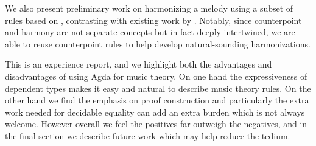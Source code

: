 We also present preliminary work on harmonizing a melody using
a subset of rules based on \citet{piston-harmony}, contrasting with
existing work by \citet{koops-fharm}. Notably, since counterpoint and
harmony are not separate concepts but in fact deeply intertwined, we
are able to reuse counterpoint rules to help develop natural-sounding
harmonizations.

This is an experience report, and we highlight both the advantages and
disadvantages of using Agda for music theory. On one hand the
expressiveness of dependent types makes it easy and natural to
describe music theory rules. On the other hand we find the emphasis on proof
construction and particularly the extra work needed for decidable
equality can add an extra burden which is not always welcome. However
overall we feel the positives far outweigh the negatives, and in the
final section we describe future work which may help reduce the tedium.

